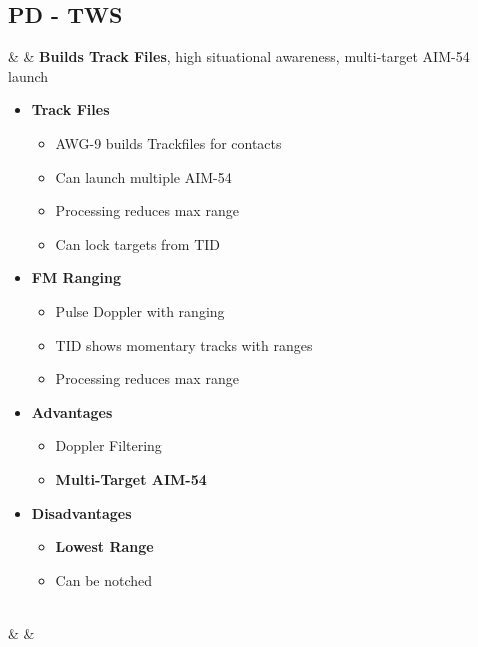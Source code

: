 \documentclass[fontInter]{TechCheck}
\begin{document}
	\clearpage

	\subsection{PD - TWS}
	\label{sec:awg9-tws}
	\thumbnar
	\begin{listlongtable}
		\textbf{\textbullet} &  & \textbf{Builds Track Files}, high situational awareness, multi-target AIM-54 launch

		\begin{minipage}[t]{\linewidth}
			\vspace{-7pt}
			\begin{itemize}
				\item \textbf{Track Files}
				\begin{itemize}
					\item AWG-9 builds Trackfiles for contacts
					\item Can launch multiple AIM-54
					\item Processing reduces max range
					\item Can lock targets from TID
				\end{itemize}
				\item \textbf{FM Ranging}
				\begin{itemize}
					\item Pulse Doppler with ranging
					\item TID shows momentary tracks with ranges
					\item Processing reduces max range
				\end{itemize}
				\item \textbf{Advantages}
				\begin{itemize}
					\item Doppler Filtering
					\item \textbf{Multi-Target AIM-54}
				\end{itemize}
				\item \textbf{Disadvantages}
				\begin{itemize}
					\item \textbf{Lowest Range}
					\item Can be notched
				\end{itemize}
			\end{itemize}
		\end{minipage} \\
		\midrule
		\textbf{\textbullet} &  &
		\begin{minipage}[t]{\linewidth}
			\vspace{-7pt}

\end{minipage}
\end{listlongtable}
\end{document}

